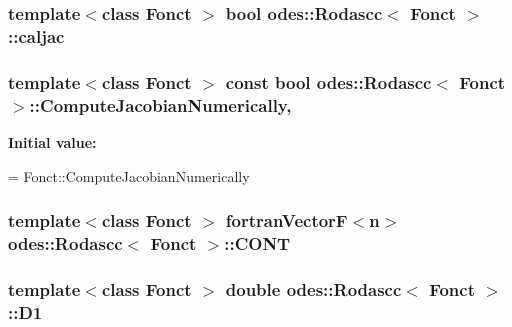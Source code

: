 \hypertarget{classodes_1_1Rodascc_a254d6f3a44ebb3c0d0ab68451193e075}{
\subsubsection[{caljac}]{\setlength{\rightskip}{0pt plus 5cm}template$<$class Fonct $>$ bool {\bf odes\-::\-Rodascc}$<$ Fonct $>$\-::caljac\hspace{0.3cm}{\ttfamily [private]}}}\label{classodes_1_1Rodascc_a254d6f3a44ebb3c0d0ab68451193e075}
\hypertarget{classodes_1_1Rodascc_a7cceb1b3012e27031d1636af2fcb71df}{
\subsubsection[{Compute\-Jacobian\-Numerically}]{\setlength{\rightskip}{0pt plus 5cm}template$<$class Fonct $>$ const bool {\bf odes\-::\-Rodascc}$<$ Fonct $>$\-::Compute\-Jacobian\-Numerically\hspace{0.3cm}{\ttfamily [static]}, {\ttfamily [private]}}}\label{classodes_1_1Rodascc_a7cceb1b3012e27031d1636af2fcb71df}
{\bfseries Initial value\-:}
\begin{DoxyCode}
=
      Fonct::ComputeJacobianNumerically
\end{DoxyCode}
\hypertarget{classodes_1_1Rodascc_a970b8605801a6eb8b515048b1de8f27d}{
\subsubsection[{C\-O\-N\-T}]{\setlength{\rightskip}{0pt plus 5cm}template$<$class Fonct $>$ {\bf fortran\-Vector\-F}$<${\bf n}$>$ {\bf odes\-::\-Rodascc}$<$ Fonct $>$\-::C\-O\-N\-T\hspace{0.3cm}{\ttfamily [private]}}}\label{classodes_1_1Rodascc_a970b8605801a6eb8b515048b1de8f27d}
\hypertarget{classodes_1_1Rodascc_a12e3f265affbfa337b46449bdfcaf791}{
\subsubsection[{D1}]{\setlength{\rightskip}{0pt plus 5cm}template$<$class Fonct $>$ double {\bf odes\-::\-Rodascc}$<$ Fonct $>$\-::D1\hspace{0.3cm}{\ttfamily [private]}}}\label{classodes_1_1Rodascc_a12e3f265affbfa337b46449bdfcaf791}
